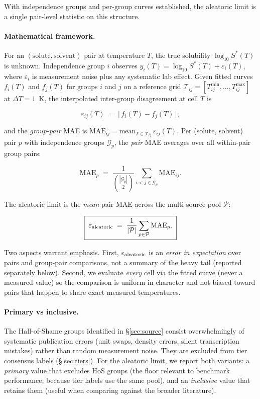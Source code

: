 With independence groups and per-group curves established, the
aleatoric limit is a single pair-level statistic on this structure.

\paragraph{Mathematical framework.}
For an $(\mathrm{solute},\mathrm{solvent})$ pair at temperature $T$, the
true solubility $\log_{10} S^{*}(T)$ is unknown.  Independence group $i$
observes $y_i(T) = \log_{10} S^{*}(T) + \varepsilon_i(T)$, where
$\varepsilon_i$ is measurement noise plus any systematic lab effect.
Given fitted curves $f_i(T)$ and $f_j(T)$ for groups $i$ and $j$ on a
reference grid $\mathcal{T}_{ij} = [T^{\min}_{ij}, \ldots, T^{\max}_{ij}]$
at $\Delta T = 1$~K, the interpolated inter-group disagreement at cell
$T$ is

\begin{equation}
  \varepsilon_{ij}(T) \;=\; \bigl|\,f_i(T) - f_j(T)\,\bigr|,
  \label{eq:eps_ij}
\end{equation}

and the \emph{group-pair} MAE is $\mathrm{MAE}_{ij} =
\mathrm{mean}_{T \in \mathcal{T}_{ij}}\,\varepsilon_{ij}(T)$.  Per
(solute, solvent) pair $p$ with independence groups $\mathcal{G}_p$, the
\emph{pair} MAE averages over all within-pair group pairs:

\begin{equation}
  \mathrm{MAE}_p \;=\; \frac{1}{\binom{|\mathcal{G}_p|}{2}}
  \sum_{i<j \in \mathcal{G}_p} \mathrm{MAE}_{ij}.
  \label{eq:mae_pair}
\end{equation}

The aleatoric limit is the \emph{mean} pair MAE across the multi-source
pool $\mathcal{P}$:

\begin{equation}
  \boxed{\;\varepsilon_{\text{aleatoric}} \;=\; \frac{1}{|\mathcal{P}|}
         \sum_{p \in \mathcal{P}} \mathrm{MAE}_p.\;}
  \label{eq:epsA}
\end{equation}

Two aspects warrant emphasis.  First, $\varepsilon_{\text{aleatoric}}$ is an \emph{error in
expectation} over pairs and group-pair comparisons, not a summary of
the heavy tail (reported separately below).  Second, we evaluate
\emph{every} cell via the fitted curve (never a measured value) so the
comparison is uniform in character and not biased toward pairs that
happen to share exact measured temperatures.

\paragraph{Primary vs inclusive.}
The Hall-of-Shame groups identified in §\ref{sec:source} consist
overwhelmingly of systematic publication errors (unit swaps, density
errors, silent transcription mistakes) rather than random measurement
noise.  They are excluded from tier consensus labels
(§\ref{sec:tiers}).  For the
aleatoric limit, we report both variants: a \emph{primary} value that
excludes HoS groups (the floor relevant to benchmark performance,
because tier labels use the same pool), and an \emph{inclusive} value
that retains them (useful when comparing against the broader
literature).

